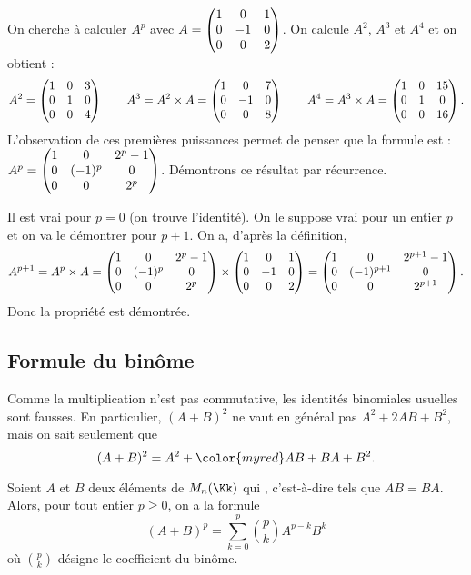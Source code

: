 \documentclass[class=report,crop=false]{standalone}
\begin{document}
\begin{exemple}
On cherche à calculer $A^{p}$ avec
$A=\begin{pmatrix}
1 & 0  & 1 \cr
0 & -1 & 0\cr
0 & 0  & 2 \cr
\end{pmatrix}$.
On calcule $A^{2}$, $A^3$ et $A^{4}$ et on obtient :
$$A^{2}= \begin{pmatrix}
1 & 0 & 3 \cr
0 & 1 & 0\cr
0 & 0 & 4 \cr
\end{pmatrix}
\qquad
A^{3}=A^2 \times A =
\begin{pmatrix}
1 & 0 & 7 \cr
0 & -1& 0\cr
0 & 0 & 8 \cr
\end{pmatrix}
\qquad
A^{4}=A^3 \times A =
\begin{pmatrix}
1 & 0 & 15 \cr
0 & 1& 0\cr
0 & 0 & 16 \cr
\end{pmatrix}.
$$
L'observation de ces premières puissances permet de penser que la formule
est : $A^{p}= \begin{pmatrix}
1 & 0       & 2^p-1 \cr
0 & (-1)^{p}& 0\cr
0 & 0       & 2^p \cr
\end{pmatrix}$.
Démontrons ce résultat par récurrence.

Il est vrai pour $p=0$ (on trouve l'identité).
On le suppose vrai pour un entier $p$ et on va
le démontrer pour $p+1$. On a, d'après la
définition,
$$A ^{p+1}=A ^{p} \times A =
\begin{pmatrix}
1 & 0       & 2^p-1 \cr
0 & (-1)^{p}& 0\cr
0 & 0       & 2^p \cr
\end{pmatrix} \times
\begin{pmatrix}
1 & 0 & 1 \cr
0 & -1& 0\cr
0 & 0 & 2 \cr
\end{pmatrix}
=\begin{pmatrix}
1 & 0       & 2^{p+1}-1 \cr
0 & (-1)^{p+1}& 0\cr
0 & 0       & 2^{p+1} \cr
\end{pmatrix}
.$$
Donc la propriété est démontrée.
\end{exemple}


\subsection{Formule du binôme}


Comme la multiplication n'est pas commutative, les identités binomiales usuelles sont fausses.
En particulier, $(A+B)^2$ ne vaut en général pas $A^2+2AB+B^2$, mais on sait seulement que
$$(A+B)^2= A^2+{\color{myred}AB+BA}+B^2.$$


\begin{proposition}[Calcul de $(A+B)^{p}$ lorsque $AB=BA$]
Soient $A$ et $B$ deux éléments de $M_{n}(\Kk)$ qui , c'est-à-dire tels que $AB=BA$.
Alors, pour tout entier $p \ge 0$, on a la formule
$$(A+B)^{p}= \sum_{k=0}^{p} \binom{p}{k} A^{p-k}B^{k}$$
où $\binom{p}{k}$ désigne le coefficient du binôme.
\end{proposition}
\end{document}
